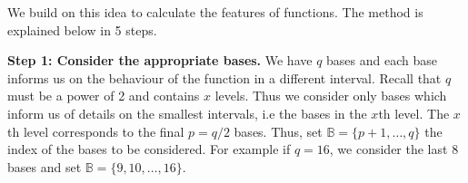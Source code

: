 \documentclass[../main.tex]{subfiles}
\begin{document}

We build on this idea to calculate the features of functions. The method is explained below in 5 steps.



{\bf Step 1: Consider the appropriate bases.} We have $q$ bases and each base informs us on the behaviour of the function in a different interval. Recall that $q$ must be a power of 2 and contains $x$ levels. Thus we consider only bases which inform us of details on the smallest intervals, i.e the bases in the $x$th level. The $x$th level corresponds to the final $p = q/2$ bases. Thus, set $\mathbb{B} = \{p+1, \dots, q\}$ the index of the bases to be considered. For example if $q=16$, we consider the last 8 bases and set $\mathbb{B} = \{9, 10, \dots, 16\}$.
\end{document}
